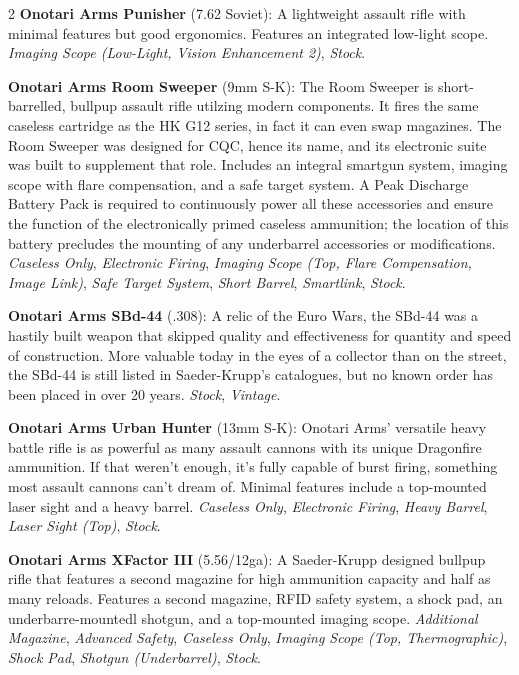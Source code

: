 \documentclass[
  oneside]{article}
\begin{document}
\begin{multicols}{2}
\textbf{Onotari Arms Punisher} (7.62 Soviet): A
lightweight assault rifle with minimal features
but good ergonomics. Features an integrated
low-light scope. \emph{Imaging Scope (Low-Light,
Vision Enhancement 2)}, \emph{Stock}.

\textbf{Onotari Arms Room Sweeper} (9mm S-K): The
Room Sweeper is short-barrelled, bullpup assault
rifle utilzing modern components. It fires the
same caseless cartridge as the HK G12 series, in
fact it can even swap magazines. The Room Sweeper
was designed for CQC, hence its name, and its
electronic suite was built to supplement that
role. Includes an integral smartgun system,
imaging scope with flare compensation, and a safe
target system. A Peak Discharge Battery Pack is
required to continuously power all these
accessories and ensure the function of the
electronically primed caseless ammunition; the
location of this battery precludes the mounting of
any underbarrel accessories or modifications.
\emph{Caseless Only}, \emph{Electronic Firing},
\emph{Imaging Scope (Top, Flare Compensation,
Image Link)}, \emph{Safe Target System},
\emph{Short Barrel}, \emph{Smartlink},
\emph{Stock}.

\textbf{Onotari Arms SBd-44} (.308): A relic of
the Euro Wars, the SBd-44 was a hastily built
weapon that skipped quality and effectiveness for
quantity and speed of construction. More valuable
today in the eyes of a collector than on the
street, the SBd-44 is still listed in
Saeder-Krupp's catalogues, but no known order has
been placed in over 20 years. \emph{Stock},
\emph{Vintage}.

\textbf{Onotari Arms Urban Hunter} (13mm S-K):
Onotari Arms' versatile heavy battle rifle is as
powerful as many assault cannons with its unique
Dragonfire ammunition. If that weren't enough,
it's fully capable of burst firing, something most
assault cannons can't dream of. Minimal features
include a top-mounted laser sight and a heavy
barrel. \emph{Caseless Only}, \emph{Electronic
Firing}, \emph{Heavy Barrel}, \emph{Laser Sight
(Top)}, \emph{Stock}.

\textbf{Onotari Arms XFactor III} (5.56/12ga): A
Saeder-Krupp designed bullpup rifle that features
a second magazine for high ammunition capacity and
half as many reloads. Features a second magazine,
RFID safety system, a shock pad, an
underbarre-mountedl shotgun, and a top-mounted
imaging scope. \emph{Additional Magazine},
\emph{Advanced Safety}, \emph{Caseless Only},
\emph{Imaging Scope (Top, Thermographic)},
\emph{Shock Pad}, \emph{Shotgun (Underbarrel)},
\emph{Stock}.


\end{multicols}
\end{document}
